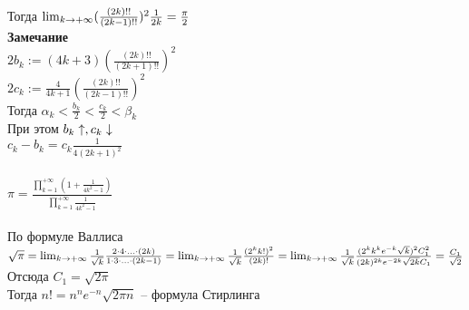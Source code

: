\documentclass[12pt]{article}
\begin{document}
Тогда $\lim_{k\rightarrow +\infty} (\frac{(2k)!!}{(2k-1)!!})^2\frac1{2k} = \frac\pi2$\\
\textbf{Замечание}\\
$2b_k:= (4k+3)(\frac{(2k)!!}{(2k+1)!!})^2$\\
$2c_k:= \frac4{4k+1}(\frac{(2k)!!}{(2k-1)!!})^2$\\
Тогда $\alpha_k < \frac{b_k}2 < \frac{c_k}2 < \beta_k$\\
При этом $b_k \uparrow, c_k \downarrow$\\
$c_k - b_k = c_k \frac1{4(2k+1)^2}$\\\\
$\pi = \frac{\prod_{k=1}^{+\infty} (1 + \frac1{4k^2-1})}{\prod_{k=1}^{+\infty} \frac1{4k^2-1}}$\\\\
По формуле Валлиса $\sqrt \pi = \lim_{k\rightarrow + \infty} \frac1{\sqrt k}\frac{2\cdot 4 \cdot \ldots \cdot (2k)}{1\cdot 3 \cdot \ldots \cdot (2k-1)} = \lim_{k\rightarrow + \infty} \frac1{\sqrt k} \frac{(2^k k!)^2}{(2k)!} = \lim_{k\rightarrow +\infty} \frac1{\sqrt k} \frac{(2^k k^k e^{-k}\sqrt{k})^2 C_1^2}{(2k)^{2k}e^{-2k}\sqrt {2k}C_1} = \frac{C_1}{\sqrt{2}}$\\
Отсюда $C_1 =\sqrt{2\pi}$\\
Тогда $n! = n^n e^{-n}\sqrt {2\pi n}$ -- формула Стирлинга\\
\end{document}
